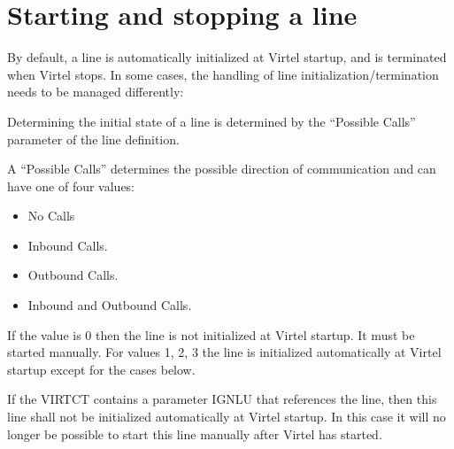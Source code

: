 \documentclass[letterpaper,10pt,english]{sphinxmanual}
\begin{document}
\section{Starting and stopping a line}
\label{\detokenize{Customization:starting-and-stopping-a-line}}\label{\detokenize{Customization:index-50}}
\sphinxAtStartPar
By default, a line is automatically initialized at Virtel startup, and is terminated when Virtel stops. In some cases, the handling of line initialization/termination needs to be managed differently:

\ignorespaces 
\sphinxAtStartPar
Determining the initial state of a line is determined by the “Possible Calls” parameter of the line definition.

\sphinxAtStartPar
{}

\sphinxAtStartPar
{}

\sphinxAtStartPar
{}

\sphinxAtStartPar
A “Possible Calls” determines the possible direction of communication and can have one of four values:\sphinxhyphen{}
\begin{itemize}
\item {} 
 \sphinxhyphen{} No Calls

\item {} 
 \sphinxhyphen{} Inbound Calls.

\item {} 
 \sphinxhyphen{} Outbound Calls.

\item {} 
 \sphinxhyphen{} Inbound and Outbound Calls.

\end{itemize}

\sphinxAtStartPar
If the value is 0 then the line is not initialized at Virtel start\sphinxhyphen{}up. It must be started manually. For values 1, 2, 3 the line is initialized automatically at Virtel start\sphinxhyphen{}up except for the cases below.

\sphinxAtStartPar
{}

\ignorespaces 
\sphinxAtStartPar
If the VIRTCT contains a parameter IGNLU that references the line, then this line shall not be initialized automatically at Virtel start\sphinxhyphen{}up. In this case it will no longer be possible to start this line manually after Virtel has started.
\end{document}
